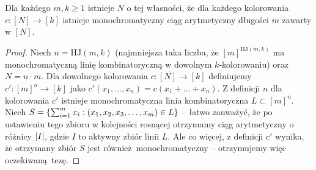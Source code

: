 \begin{theorem}
	Dla każdego \(m,k \ge 1\) istnieje \(N\) o tej własności, że dla każdego kolorowania \(c : [N] \to [k]\) istnieje monochromatyczny ciąg arytmetyczny długości \(m\) zawarty w \([N]\).
\end{theorem}
\begin{proof}
	Niech \(n = \text{HJ}(m,k)\) (najmniejsza taka liczba, że \([m]^{\text{HJ}(m,k)}\) ma monochromatyczną linię kombinatoryczną w dowolnym \(k\)-kolorowaniu) oraz \(N = n\cdot m\).
	Dla dowolnego kolorowania \(c:[N]\to [k]\) definiujemy \(c': [m]^n \to [k]\) jako \(c'(x_1,\ldots,x_n) = c(x_1+\ldots+x_n)\). Z definicji \(n\) dla kolorowania \(c'\) istnieje monochromatyczna
	linia kombinatoryczna \(L \subset [m]^n\). Niech \(S = \set{\sum_{i=1}^{m} x_i : (x_1, x_2, x_3, \ldots, x_m) \in L}\) -- łatwo zauważyć, że po ustawieniu tego
	zbioru w kolejności rosnącej otrzymamy ciąg arytmetyczny o różnicy \(\card{I}\), gdzie \(I\) to aktywny zbiór linii \(L\). Ale co więcej, z definicji \(c'\) wynika, że
	otrzymany zbiór \(S\) jest również monochromatyczny -- otrzymujemy więc oczekiwaną tezę.
\end{proof}

